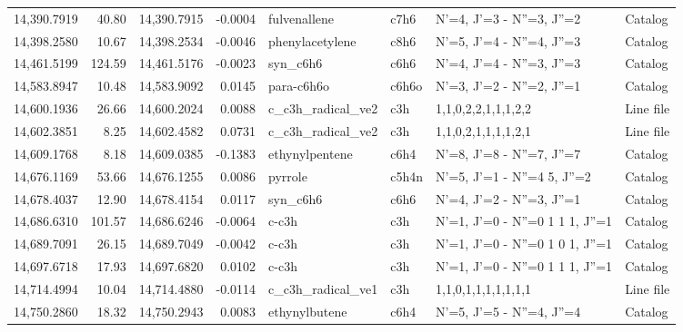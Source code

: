 \begin{longtable}{rrrrllll}
14,390.7919 &     40.80 &       14,390.7915 &   -0.0004 &                fulvenallene &    c7h6 &            N'=4, J'=3 - N''=3, J''=2 &    Catalog \\
14,398.2580 &     10.67 &       14,398.2534 &   -0.0046 &             phenylacetylene &    c8h6 &            N'=5, J'=4 - N''=4, J''=3 &    Catalog \\
14,461.5199 &    124.59 &       14,461.5176 &   -0.0023 &                    syn_c6h6 &    c6h6 &            N'=4, J'=4 - N''=3, J''=3 &    Catalog \\
14,583.8947 &     10.48 &       14,583.9092 &    0.0145 &                  para-c6h6o &   c6h6o &            N'=3, J'=2 - N''=2, J''=1 &    Catalog \\
14,600.1936 &     26.66 &       14,600.2024 &    0.0088 &           c_c3h_radical_ve2 &     c3h &                  1,1,0,2,2,1,1,1,2,2 &  Line file \\
14,602.3851 &      8.25 &       14,602.4582 &    0.0731 &           c_c3h_radical_ve2 &     c3h &                  1,1,0,2,1,1,1,1,2,1 &  Line file \\
14,609.1768 &      8.18 &       14,609.0385 &   -0.1383 &              ethynylpentene &    c6h4 &            N'=8, J'=8 - N''=7, J''=7 &    Catalog \\
14,676.1169 &     53.66 &       14,676.1255 &    0.0086 &                     pyrrole &   c5h4n &      N'=5, J'=1 - N''=4     5, J''=2 &    Catalog \\
14,678.4037 &     12.90 &       14,678.4154 &    0.0117 &                    syn_c6h6 &    c6h6 &            N'=4, J'=2 - N''=3, J''=1 &    Catalog \\
14,686.6310 &    101.57 &       14,686.6246 &   -0.0064 &                       c-c3h &     c3h &      N'=1, J'=0 - N''=0 1 1 1, J''=1 &    Catalog \\
14,689.7091 &     26.15 &       14,689.7049 &   -0.0042 &                       c-c3h &     c3h &      N'=1, J'=0 - N''=0 1 0 1, J''=1 &    Catalog \\
14,697.6718 &     17.93 &       14,697.6820 &    0.0102 &                       c-c3h &     c3h &      N'=1, J'=0 - N''=0 1 1 1, J''=1 &    Catalog \\
14,714.4994 &     10.04 &       14,714.4880 &   -0.0114 &           c_c3h_radical_ve1 &     c3h &                  1,1,0,1,1,1,1,1,1,1 &  Line file \\
14,750.2860 &     18.32 &       14,750.2943 &    0.0083 &               ethynylbutene &    c6h4 &            N'=5, J'=5 - N''=4, J''=4 &    Catalog \\

\end{longtable}
